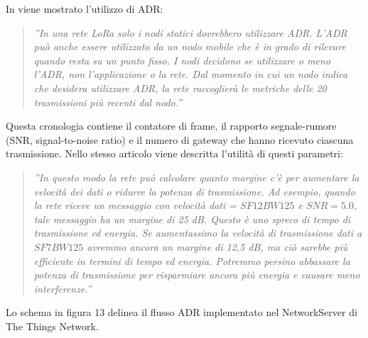 \documentclass[a4paper]{report} %
\begin{document}
In \cite{art:rif.32} viene mostrato l'utilizzo di ADR:
\begin{quote}
	\textit{''In una rete LoRa solo i nodi statici dovrebbero utilizzare ADR. L'ADR può anche essere utilizzato da un nodo mobile che è in grado di rilevare quando resta su un punto fisso. I nodi decidono se utilizzare o meno l'ADR, non l'applicazione o la rete. Dal momento in cui un nodo indica che desidera utilizzare ADR, la rete raccoglierà le metriche delle 20 trasmissioni più recenti dal nodo.''}
\end{quote}
Questa cronologia contiene il contatore di frame, il rapporto segnale-rumore (SNR, signal-to-noise ratio) e il numero di gateway che hanno ricevuto ciascuna trasmissione. Nello stesso articolo viene descritta l'utilità di questi parametri:
\begin{quote}
	\textit{''In questo modo la rete può calcolare quanto margine c'è per aumentare la velocità dei dati o ridurre la potenza di trasmissione. Ad esempio, quando la rete riceve un messaggio con velocità dati = $SF12BW125$ e $SNR = 5.0$, tale messaggio ha un margine di 25 dB. Questo è uno spreco di tempo di trasmissione ed energia. Se aumentassimo la velocità di trasmissione dati a $SF7BW125$ avremmo ancora un margine di 12,5 dB, ma ciò sarebbe più efficiente in termini di tempo ed energia. Potremmo persino abbassare la potenza di trasmissione per risparmiare ancora più energia e causare meno interferenze.''} 
\end{quote}	
Lo schema in figura 13 delinea il flusso ADR implementato nel NetworkServer di The Things Network.
\end{document}

